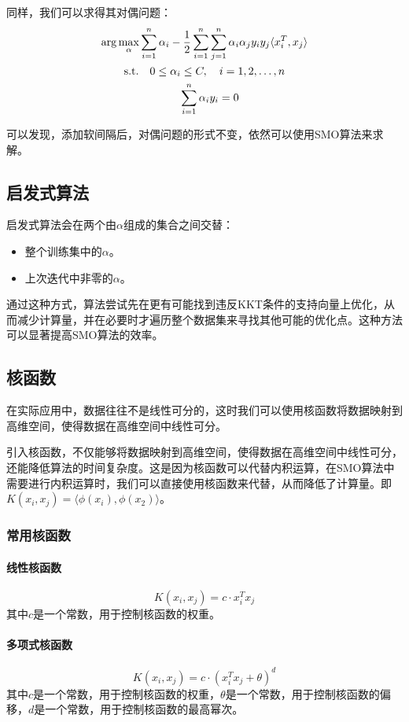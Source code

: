 \documentclass[a4paper]{article}
\begin{document}
同样，我们可以求得其对偶问题：
\begin{gather}
    \arg\max_{\alpha} \sum_{i=1}^{n}\alpha_i - \frac{1}{2}\sum_{i=1}^{n}\sum_{j=1}^{n}\alpha_i\alpha_jy_iy_j\langle x_i^T, x_j\rangle  \notag \\
    \text{s.t.} \quad 0 \leq \alpha_i \leq C, \quad i=1,2,\ldots,n \notag \\
    \quad \sum_{i=1}^{n}\alpha_iy_i = 0 \notag
\end{gather}

可以发现，添加软间隔后，对偶问题的形式不变，依然可以使用SMO算法来求解。

\subsection{启发式算法}
启发式算法会在两个由$\alpha$组成的集合之间交替：
\begin{itemize}
    \item 整个训练集中的$\alpha$。
    \item 上次迭代中非零的$\alpha$。
\end{itemize}

通过这种方式，算法尝试先在更有可能找到违反KKT条件的支持向量上优化，从而减少计算量，并在必要时才遍历整个数据集来寻找其他可能的优化点。这种方法可以显著提高SMO算法的效率。
\subsection{核函数}
在实际应用中，数据往往不是线性可分的，这时我们可以使用核函数将数据映射到高维空间，使得数据在高维空间中线性可分。

引入核函数，不仅能够将数据映射到高维空间，使得数据在高维空间中线性可分，还能降低算法的时间复杂度。这是因为核函数可以代替内积运算，在SMO算法中需要进行内积运算时，我们可以直接使用核函数来代替，从而降低了计算量。即$K(x_i, x_j) = \langle \phi(x_i), \phi(x_2)\rangle$。

\subsubsection{常用核函数}

\paragraph*{线性核函数}
\[K(x_i, x_j) = c\cdot x_i^Tx_j\]
其中$c$是一个常数，用于控制核函数的权重。

\paragraph*{多项式核函数}
\[K(x_i, x_j) = c\cdot (x_i^Tx_j + \theta)^d\]
其中$c$是一个常数，用于控制核函数的权重，$\theta$是一个常数，用于控制核函数的偏移，$d$是一个常数，用于控制核函数的最高幂次。
\end{document}
